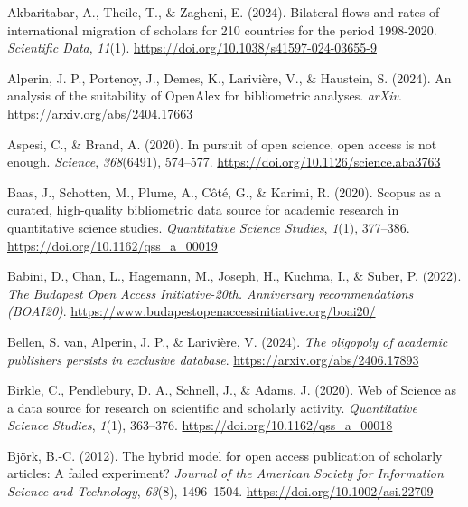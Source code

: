 \documentclass[a4paper,man,floatsintext,longtable,noextraspace,10pt]{apa6}
\newlength{\cslhangindent}
\newenvironment{CSLReferences}[2] %
{\begin{list}{}{%
  \setlength{\itemindent}{0pt}
  \setlength{\leftmargin}{0pt}
  \setlength{\parsep}{0pt}
  \ifodd #1
  \setlength{\leftmargin}{\cslhangindent}
  \setlength{\itemindent}{-1\cslhangindent}
  \fi
  \setlength{\itemsep}{#2\baselineskip}}}
{\end{list}}
\begin{document}
\label{refs}
\begin{CSLReferences}{1}{0}
Akbaritabar, A., Theile, T., \& Zagheni, E. (2024). Bilateral flows and
rates of international migration of scholars for 210 countries for the
period 1998-2020. \emph{Scientific Data}, \emph{11}(1).
\url{https://doi.org/10.1038/s41597-024-03655-9}

Alperin, J. P., Portenoy, J., Demes, K., Larivière, V., \& Haustein, S.
(2024). An analysis of the suitability of OpenAlex for bibliometric
analyses. \emph{arXiv}. \url{https://arxiv.org/abs/2404.17663}

Aspesi, C., \& Brand, A. (2020). In pursuit of open science, open access
is not enough. \emph{Science}, \emph{368}(6491), 574--577.
\url{https://doi.org/10.1126/science.aba3763}

Baas, J., Schotten, M., Plume, A., Côté, G., \& Karimi, R. (2020).
Scopus as a curated, high-quality bibliometric data source for academic
research in quantitative science studies. \emph{Quantitative Science
Studies}, \emph{1}(1), 377--386.
\url{https://doi.org/10.1162/qss_a_00019}

Babini, D., Chan, L., Hagemann, M., Joseph, H., Kuchma, I., \& Suber, P.
(2022). \emph{{The Budapest Open Access Initiative-20th. Anniversary
recommendations (BOAI20)}}.
\url{https://www.budapestopenaccessinitiative.org/boai20/}

Bellen, S. van, Alperin, J. P., \& Larivière, V. (2024). \emph{The
oligopoly of academic publishers persists in exclusive database}.
\url{https://arxiv.org/abs/2406.17893}

Birkle, C., Pendlebury, D. A., Schnell, J., \& Adams, J. (2020). {Web of
Science} as a data source for research on scientific and scholarly
activity. \emph{Quantitative Science Studies}, \emph{1}(1), 363--376.
\url{https://doi.org/10.1162/qss_a_00018}

Björk, B.-C. (2012). The hybrid model for open access publication of
scholarly articles: A failed experiment? \emph{Journal of the American
Society for Information Science and Technology}, \emph{63}(8),
1496--1504. \url{https://doi.org/10.1002/asi.22709}


\end{CSLReferences}
\end{document}

